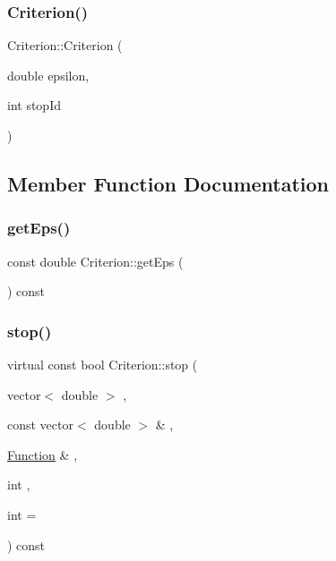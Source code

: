 \subsubsection{\texorpdfstring{Criterion()}{Criterion()}}
{\footnotesize\ttfamily Criterion\+::\+Criterion (\begin{DoxyParamCaption}\item[{double}]{epsilon,  }\item[{int}]{stop\+Id }\end{DoxyParamCaption})\hspace{0.3cm}{\ttfamily [inline]}}



\subsection{Member Function Documentation}
\mbox{\label{class_criterion_a1d04f36050bb555469cea3e9a2f7b6f0}} 
\subsubsection{\texorpdfstring{get\+Eps()}{getEps()}}
{\footnotesize\ttfamily const double Criterion\+::get\+Eps (\begin{DoxyParamCaption}{ }\end{DoxyParamCaption}) const\hspace{0.3cm}{\ttfamily [inline]}}

\mbox{\label{class_criterion_aee3e2148c665c72c50c2f870a3ca8cdc}} 
\subsubsection{\texorpdfstring{stop()}{stop()}}
{\footnotesize\ttfamily virtual const bool Criterion\+::stop (\begin{DoxyParamCaption}\item[{vector$<$ double $>$}]{,  }\item[{const vector$<$ double $>$ \&}]{,  }\item[{\hyperlink{class_function}{Function} \&}]{,  }\item[{int}]{,  }\item[{int}]{ = {} }\end{DoxyParamCaption}) const\hspace{0.3cm}{\ttfamily [pure virtual]}}



